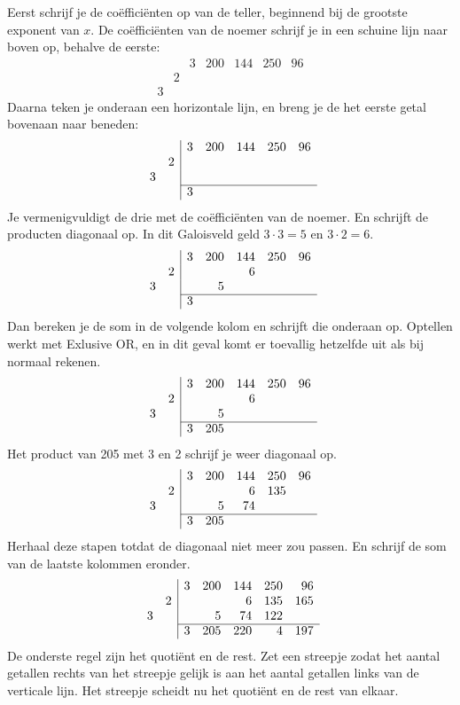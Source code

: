 \documentclass{article}
\begin{document}
Eerst schrijf je de coëfficiënten op van de teller, beginnend bij de grootste exponent van $x$. De coëfficiënten van de noemer schrijf je in een schuine lijn naar boven op, behalve de eerste:
\[\begin{array}{rr|rrrrr}
&&3&200&144&250&96\\
&2\\
3&&
\end{array}\]
Daarna teken je onderaan een horizontale lijn, en breng je de het eerste getal bovenaan naar beneden:
\[\begin{array}{rr|rrrrr}
&&3&200&144&250&96\\
&2\\
3&&\\\cline{3-7}
&&3
\end{array}\]
Je vermenigvuldigt de drie met de coëfficiënten van de noemer. En schrijft de producten diagonaal op. In dit Galoisveld geld $3\cdot3=5$ en $3\cdot2=6$.
\[\begin{array}{rr|rrrrr}
&&3&200&144&250&96\\
&2&&&6\\
3&&&5\\\cline{3-7}
&&3
\end{array}\]
Dan bereken je de som in de volgende kolom en schrijft die onderaan op. Optellen werkt met Exlusive OR, en in dit geval komt er toevallig hetzelfde uit als bij normaal rekenen.
\[\begin{array}{rr|rrrrr}
&&3&200&144&250&96\\
&2&&&6\\
3&&&5\\\cline{3-7}
&&3&205
\end{array}\]
Het product van 205 met 3 en 2 schrijf je weer diagonaal op.
\[\begin{array}{rr|rrrrr}
&&3&200&144&250&96\\
&2&&&6&135\\
3&&&5&74\\\cline{3-7}
&&3&205
\end{array}\]
Herhaal deze stapen totdat de diagonaal niet meer zou passen. En schrijf de som van de laatste kolommen eronder.
\[\begin{array}{rr|rrrrr}
&&3&200&144&250&96\\
&2&&&6&135&165\\
3&&&5&74&122\\\cline{3-7}
&&3&205&220&4&197
\end{array}\]
De onderste regel zijn het quotiënt en de rest. Zet een streepje zodat het aantal getallen rechts van het streepje gelijk is aan het aantal getallen links van de verticale lijn. Het streepje scheidt nu het quotiënt en de rest van elkaar.
\end{document}
